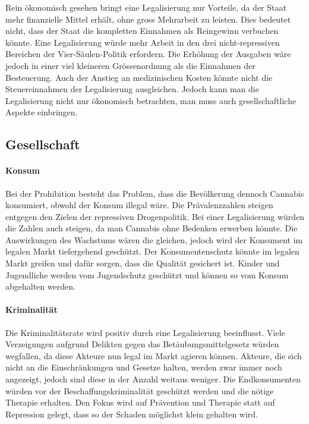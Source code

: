 \documentclass[../main.tex]{subfiles}
\begin{document}
	\noindent
	Rein ökonomisch gesehen bringt eine Legalisierung nur Vorteile, da der Staat mehr finanzielle Mittel erhält, ohne gross Mehrarbeit zu leisten.
	Dies bedeutet nicht, dass der Staat die kompletten Einnahmen als Reingewinn verbuchen könnte.
	Eine Legalisierung würde mehr Arbeit in den drei nicht-repressiven Bereichen der Vier-Säulen-Politik erfordern.
	Die Erhöhung der Ausgaben wäre jedoch in einer viel kleineren Grössenordnung als die Einnahmen der Besteuerung.
	Auch der Anstieg an medizinischen Kosten könnte nicht die Steuereinnahmen der Legalisierung ausgleichen.
	Jedoch kann man die Legalisierung nicht nur ökonomisch betrachten, man muss auch gesellschaftliche Aspekte einbringen.
	
	
	\subsection{Gesellschaft}
	
	\paragraph{Konsum}
	Bei der Prohibition besteht das Problem, dass die Bevölkerung dennoch Cannabis konsumiert, obwohl der Konsum illegal wäre.
	Die Prävalenzzahlen steigen entgegen den Zielen der repressiven Drogenpolitik.
	Bei einer Legalisierung würden die Zahlen auch steigen, da man Cannabis ohne Bedenken erwerben könnte.
	Die Auswirkungen des Wachstums wären die gleichen, jedoch wird der Konsument im legalen Markt tiefergehend geschützt.
	Der Konsumentenschutz könnte im legalen Markt greifen und dafür sorgen, dass die Qualität gesichert ist.
	Kinder und Jugendliche werden vom Jugendschutz geschützt und können so vom Konsum abgehalten werden.
	
	\paragraph{Kriminalität}
	Die Kriminalitätsrate wird positiv durch eine Legalisierung beeinflusst.
	Viele Verzeigungen aufgrund Delikten gegen das Betäubungsmittelgesetz würden wegfallen, da diese Akteure nun legal im Markt agieren können.
	Akteure, die sich nicht an die Einschränkungen und Gesetze halten, werden zwar immer noch angezeigt, jedoch sind diese in der Anzahl weitaus weniger.
	Die Endkonsumenten würden vor der Beschaffungskriminalität geschützt werden und die nötige Therapie erhalten.
	Den Fokus wird auf Prävention und Therapie statt auf Repression gelegt, dass so der Schaden möglichst klein gehalten wird.
	
\end{document}

